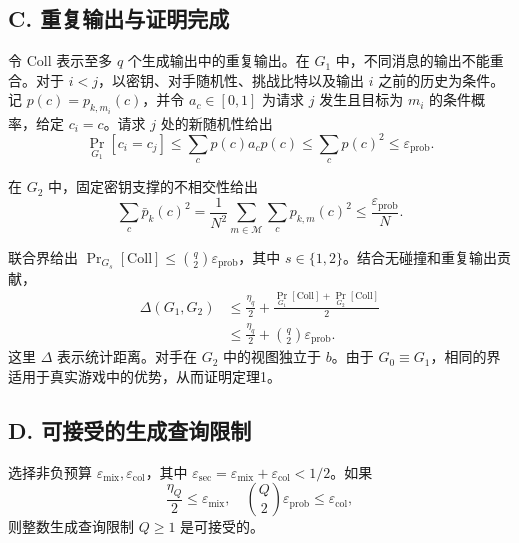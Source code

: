 \subsection*{C. 重复输出与证明完成}

令 \(\mathrm{Coll}\) 表示至多 \(q\) 个生成输出中的重复输出。在 \(G_1\) 中，不同消息的输出不能重合。对于 \(i < j\)，以密钥、对手随机性、挑战比特以及输出 \(i\) 之前的历史为条件。记 \(p(c) = p_{k,m_i}(c)\)，并令 \(a_c \in [0,1]\) 为请求 \(j\) 发生且目标为 \(m_i\) 的条件概率，给定 \(c_i = c\)。请求 \(j\) 处的新随机性给出
\begin{equation}
\Pr_{G_1}[c_i = c_j] \le \sum_c p(c) a_c p(c) \le \sum_c p(c)^2 \le \varepsilon_{\mathrm{prob}}. \tag{40}
\end{equation}

在 \(G_2\) 中，固定密钥支撑的不相交性给出
\begin{equation}
\sum_c \bar{p}_k(c)^2 = \frac{1}{N^2} \sum_{m \in \mathcal{M}} \sum_c p_{k,m}(c)^2 \le \frac{\varepsilon_{\mathrm{prob}}}{N}. \tag{41}
\end{equation}

联合界给出 \(\Pr_{G_s}[\mathrm{Coll}] \le \binom{q}{2} \varepsilon_{\mathrm{prob}}\)，其中 \(s \in \{1,2\}\)。结合无碰撞和重复输出贡献，
\begin{equation}
\begin{aligned}
\Delta(G_1, G_2) &\le \frac{\eta_q}{2} + \frac{\Pr_{G_1}[\mathrm{Coll}] + \Pr_{G_2}[\mathrm{Coll}]}{2} \\
&\le \frac{\eta_q}{2} + \binom{q}{2} \varepsilon_{\mathrm{prob}}.
\end{aligned} \tag{42}
\end{equation}
这里 \(\Delta\) 表示统计距离。对手在 \(G_2\) 中的视图独立于 \(b\)。由于 \(G_0 \equiv G_1\)，相同的界适用于真实游戏中的优势，从而证明定理1。

\subsection*{D. 可接受的生成查询限制}

选择非负预算 \(\varepsilon_{\mathrm{mix}}, \varepsilon_{\mathrm{col}}\)，其中 \(\varepsilon_{\mathrm{sec}} = \varepsilon_{\mathrm{mix}} + \varepsilon_{\mathrm{col}} < 1/2\)。如果
\begin{equation}
\frac{\eta_Q}{2} \le \varepsilon_{\mathrm{mix}}, \quad \binom{Q}{2} \varepsilon_{\mathrm{prob}} \le \varepsilon_{\mathrm{col}}, \tag{43}
\end{equation}
则整数生成查询限制 \(Q \ge 1\) 是可接受的。

